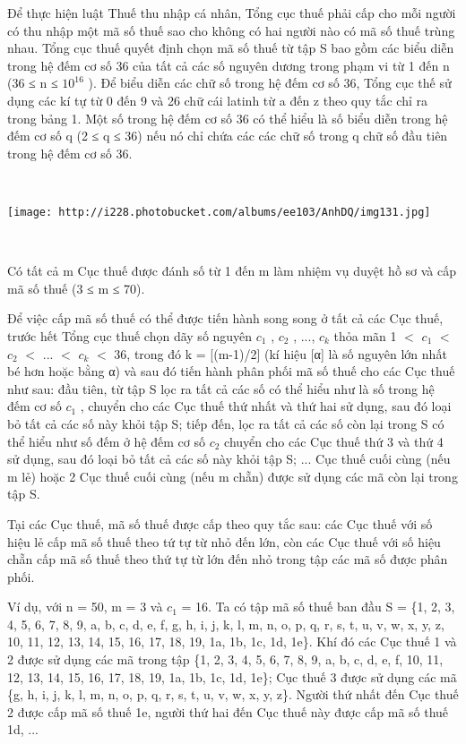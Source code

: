 

Để thực hiện luật Thuế thu nhập cá nhân, Tổng cục thuế phải cấp cho mỗi người có thu nhập một mã số thuế sao cho không có hai người nào có mã số thuế trùng nhau. Tổng cục thuế quyết định chọn mã số thuế từ tập S bao gồm các biểu diễn trong hệ đếm cơ số 36 của tất cả các số nguyên dương trong phạm vi từ 1 đến n (36 ≤ n ≤ $10^{16}$ ). Để biểu diễn các chữ số trong hệ đếm cơ số 36, Tổng cục thế sử dụng các kí tự từ 0 đến 9 và 26 chữ cái latinh từ a đến z theo quy tắc chỉ ra trong bảng 1. Một số trong hệ đếm cơ số 36 có thể hiểu là số biểu diễn trong hệ đếm cơ số q (2 ≤ q ≤ 36) nếu nó chỉ chứa các các chữ số trong q chữ số đầu tiên trong hệ đếm cơ số 36.

 


\texttt{[image: http://i228.photobucket.com/albums/ee103/AnhDQ/img131.jpg]}

 

Có tất cả m Cục thuế được đánh số từ 1 đến m làm nhiệm vụ duyệt hồ sơ và cấp mã số thuế (3 ≤ m ≤ 70).

Để việc cấp mã số thuế có thể được tiến hành song song ở tất cả các Cục thuế, trước hết Tổng cục thuế chọn dãy số nguyên $c_{1}$ , $c_{2}$ , ..., $c_{k}$ thỏa mãn 1 $<$ $c_{1}$ $<$ $c_{2}$ $<$ ... $<$ $c_{k}$ $<$ 36, trong đó k = [(m-1)/2] (kí hiệu [α] là số nguyên lớn nhất bé hơn hoặc bằng α) và sau đó tiến hành phân phối mã số thuế cho các Cục thuế như sau: đầu tiên, từ tập S lọc ra tất cả các số có thể hiểu như là số trong hệ đếm cơ số $c_{1}$ , chuyển cho các Cục thuế thứ nhất và thứ hai sử dụng, sau đó loại bỏ tất cả các số này khỏi tập S; tiếp đến, lọc ra tất cả các số còn lại trong S có thể hiểu như số đếm ở hệ đếm cơ số $c_{2}$ chuyển cho các Cục thuế thứ 3 và thứ 4 sử dụng, sau đó loại bỏ tất cả các số này khỏi tập S; ... Cục thuế cuối cùng (nếu m lẻ) hoặc 2 Cục thuế cuối cùng (nếu m chẵn) được sử dụng các mã còn lại trong tập S.

Tại các Cục thuế, mã số thuế được cấp theo quy tắc sau: các Cục thuế với số hiệu lẻ cấp mã số thuế theo tứ tự từ nhỏ đến lớn, còn các Cục thuế với số hiệu chẵn cấp mã số thuế theo thứ tự từ lớn đến nhỏ trong tập các mã số được phân phối.

Ví dụ, với n = 50, m = 3 và $c_{1}$ = 16. Ta có tập mã số thuế ban đầu S = \{1, 2, 3, 4, 5, 6, 7, 8, 9, a, b, c, d, e, f, g, h, i, j, k, l, m, n, o, p, q, r, s, t, u, v, w, x, y, z, 10, 11, 12, 13, 14, 15, 16, 17, 18, 19, 1a, 1b, 1c, 1d, 1e\}. Khí đó các Cục thuế 1 và 2 được sử dụng các mã trong tập \{1, 2, 3, 4, 5, 6, 7, 8, 9, a, b, c, d, e, f, 10, 11, 12, 13, 14, 15, 16, 17, 18, 19, 1a, 1b, 1c, 1d, 1e\}; Cục thuế 3 được sử dụng các mã \{g, h, i, j, k, l, m, n, o, p, q, r, s, t, u, v, w, x, y, z\}. Người thứ nhất đến Cục thuế 2 được cấp mã số thuế 1e, người thứ hai đến Cục thuế này được cấp mã số thuế 1d, ...


